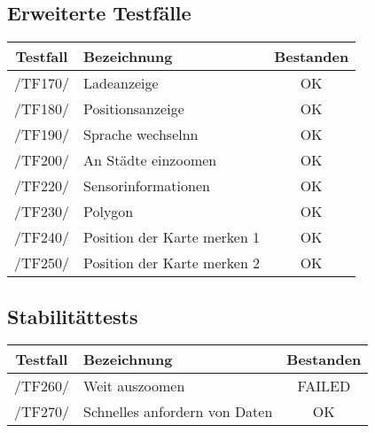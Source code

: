 \subsection{Erweiterte Testfälle}

\begin{center}
    \begin{tabular}[h]{|c|l|c|}
    \hline
        \textbf{Testfall} & \textbf{Bezeichnung} & \textbf{Bestanden} \\
        \hline
        /TF170/ & Ladeanzeige & \cellcolor{green!25}OK \\
        \hline
        /TF180/ & Positionsanzeige & \cellcolor{green!25}OK \\
        \hline
         /TF190/ & Sprache wechselnn & \cellcolor{green!25}OK \\
        \hline
         /TF200/ & An Städte einzoomen & \cellcolor{green!25}OK \\
        \hline
        /TF220/ & Sensorinformationen & \cellcolor{green!25}OK \\
        \hline
         /TF230/ & Polygon & \cellcolor{green!25}OK \\
        \hline
         /TF240/ & Position der Karte merken 1 & \cellcolor{green!25}OK \\
        \hline
          /TF250/ & Position der Karte merken 2 & \cellcolor{green!25}OK \\
        \hline

    \end{tabular}
\end{center}

\subsection{Stabilitättests}
  \begin{center}
      \begin{tabular}[h]{|c|l|c|}
       \hline
        \textbf{Testfall} & \textbf{Bezeichnung} & \textbf{Bestanden} \\
        \hline
       /TF260/ & Weit auszoomen & \cellcolor{red!25}FAILED \\
        \hline
          /TF270/ & Schnelles anfordern von Daten & \cellcolor{green!25}OK \\
        \hline
      \end{tabular}
  \end{center}


